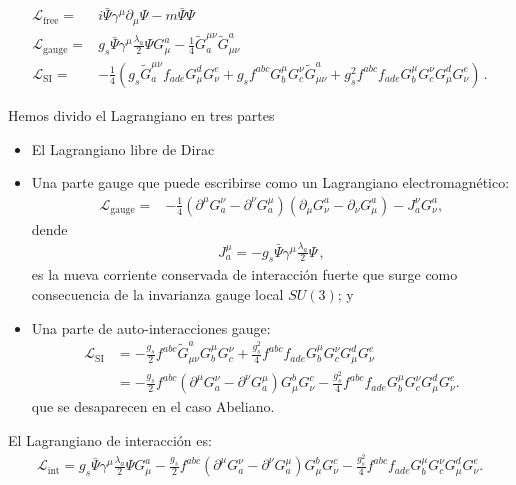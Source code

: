 \begin{align}
\label{eq:qcdgauge}
\mathcal{L}_{\text{free}}=&i\bar{\Psi}\gamma^\mu\partial_\mu\Psi-m\bar{\Psi}\Psi\nonumber\\
  \mathcal{L}_{\text{gauge}}=&g_s\bar{\Psi}\gamma^\mu\frac{\lambda_a}{2}\Psi G_\mu^a
  - \frac{1}{4}\widetilde{G}^{\mu\nu}_a \widetilde{G}_{\mu\nu}^a\nonumber\\
  \mathcal{L}_{\text{SI}}=&- \frac{1}{4}\left(g_s\widetilde{G}^{\mu\nu}_af_{a d e}G^d_\mu G^e_\nu
    +g_sf^{a b c}G_b^\mu G_c^\nu\widetilde{G}_{\mu\nu}^a
    +g_s^2f^{a b c}f_{a d e}G_b^\mu G_c^\nu G^d_\mu G^e_\nu\right)\,.
\end{align}

Hemos divido el Lagrangiano en tres partes
\begin{itemize}
\item El Lagrangiano libre de Dirac
\item Una parte gauge que puede escribirse como un Lagrangiano electromagnético:
\begin{align}
  \mathcal{L}_{\text{gauge}}=&-\frac{1}{4}\left(\partial^\mu G^\nu_a-\partial^\nu G^\mu_a\right)\left(\partial_\mu G_\nu^a-\partial_\nu G_\mu^a\right)-J^\nu_aG_\nu^a,
\end{align}
dende
\begin{align}
  J^\mu_a=-g_s\bar{\Psi}\gamma^\mu\frac{\lambda_a}{2}\Psi\,,
\end{align}
es la nueva corriente conservada de interacción fuerte que surge como consecuencia de la invarianza gauge local $SU(3)$; y 
\item Una parte de auto-interacciones gauge:
  \begin{align}
    \mathcal{L}_{\text{SI}}  &=- \frac{g_s}{2}f^{a b c}\widetilde{G}_{\mu\nu}^aG_b^\mu G_c^\nu
    +\frac{g_s^2}{4}f^{a b c}f_{a d e}G_b^\mu G_c^\nu G^d_\mu G^e_\nu\nonumber\\
  &=-\frac{g_s}{2}f^{abc}\left(\partial^\mu G^\nu_a-\partial^\nu G^\mu_a\right)G^b_\mu G^c_\nu-\frac{g_s^2}{4}f^{abc}f_{ade}G^\mu_bG^\nu_cG^d_\mu G^e_\nu.
  \end{align}
que se desaparecen en el caso Abeliano.
\end{itemize}

El Lagrangiano de interacción es:
\begin{align}
  \mathcal{L}_{\text{int}}=g_s\bar{\Psi}\gamma^\mu\frac{\lambda_a}{2}\Psi G_\mu^a-\frac{g_s}{2}f^{abc}\left(\partial^\mu G^\nu_a-\partial^\nu G^\mu_a\right)G^b_\mu G^c_\nu-\frac{g_s^2}{4}f^{abc}f_{ade}G^\mu_bG^\nu_cG^d_\mu G^e_\nu.
\end{align}

